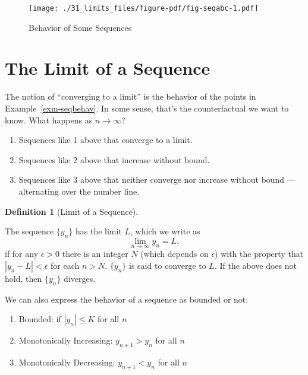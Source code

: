 \documentclass[
  letterpaper,
]{book}
\providecommand{\tightlist}{%
  \setlength{\itemsep}{0pt}\setlength{\parskip}{0pt}}\usepackage{longtable,booktabs,array}
\theoremstyle{definition}
\newtheorem{definition}{Definition}[chapter]
\theoremstyle{definition}
\theoremstyle{plain}
\theoremstyle{definition}
\theoremstyle{plain}
\theoremstyle{plain}
\theoremstyle{remark}
\begin{document}
\begin{figure}

{\centering \texttt{[image: ./31\_limits\_files/figure-pdf/fig-seqabc-1.pdf]}

}

\caption{\label{fig-seqabc}Behavior of Some Sequences}

\end{figure}

\hypertarget{the-limit-of-a-sequence}{%
\section{The Limit of a Sequence}\label{the-limit-of-a-sequence}}

The notion of ``converging to a limit'' is the behavior of the points in
Example~\ref{exm-seqbehav}. In some sense, that's the counterfactual we
want to know. What happens as \(n\rightarrow \infty\)?

\begin{enumerate}
\def\labelenumi{\arabic{enumi}.}
\tightlist
\item
  Sequences like 1 above that converge to a limit.
\item
  Sequences like 2 above that increase without bound.
\item
  Sequences like 3 above that neither converge nor increase without
  bound --- alternating over the number line.
\end{enumerate}

\leavevmode{}%
\begin{definition}[Limit of a Sequence]\label{def-seqlim}

The sequence \(\{y_n\}\) has the limit \(L\), which we write as
\[\lim\limits_{n \to \infty} y_n =L,\] if for any \(\epsilon>0\) there
is an integer \(N\) (which depends on \(\epsilon\)) with the property
that \(|y_n -L|<\epsilon\) for each \(n>N\). \(\{y_n\}\) is said to
converge to \(L\). If the above does not hold, then \(\{y_n\}\)
diverges.

\end{definition}

We can also express the behavior of a sequence as bounded or not:

\begin{enumerate}
\def\labelenumi{\arabic{enumi}.}
\tightlist
\item
  Bounded: if \(|y_n|\le K\) for all \(n\)
\item
  Monotonically Increasing: \(y_{n+1}>y_n\) for all \(n\)
\item
  Monotonically Decreasing: \(y_{n+1}<y_n\) for all \(n\)
\end{enumerate}
\end{document}
